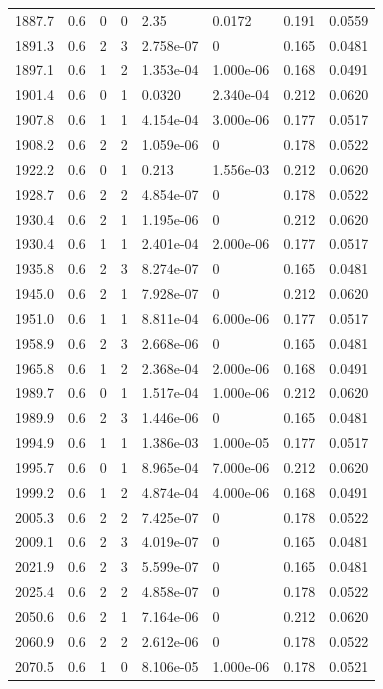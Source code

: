 \documentclass[preview]{standalone}
\begin{document}
{{{{\begin{tabular}{L{1.2cm}C{1.2cm} C{0.3cm}C{0.5cm} C{1.4cm}C{1.4cm} C{1.4cm}C{1.4cm}}
  1887.7  &   0.6  & 0     &  0 &  2.35  & 0.0172  & 0.191 &  0.0559   \\ 
  1891.3  &   0.6  & 2     &  3 &  2.758e-07  & 0  & 0.165 &  0.0481   \\ 
  1897.1  &   0.6  & 1     &  2 &  1.353e-04  & 1.000e-06  & 0.168 &  0.0491   \\ 
  1901.4  &   0.6  & 0     &  1 &  0.0320  & 2.340e-04  & 0.212 &  0.0620   \\ 
  1907.8  &   0.6  & 1     &  1 &  4.154e-04  & 3.000e-06  & 0.177 &  0.0517   \\ 
  1908.2  &   0.6  & 2     &  2 &  1.059e-06  & 0  & 0.178 &  0.0522   \\ 
  1922.2  &   0.6  & 0     &  1 &  0.213  & 1.556e-03  & 0.212 &  0.0620   \\ 
  1928.7  &   0.6  & 2     &  2 &  4.854e-07  & 0  & 0.178 &  0.0522   \\ 
  1930.4  &   0.6  & 2     &  1 &  1.195e-06  & 0  & 0.212 &  0.0620   \\ 
  1930.4  &   0.6  & 1     &  1 &  2.401e-04  & 2.000e-06  & 0.177 &  0.0517   \\ 
  1935.8  &   0.6  & 2     &  3 &  8.274e-07  & 0  & 0.165 &  0.0481   \\ 
  1945.0  &   0.6  & 2     &  1 &  7.928e-07  & 0  & 0.212 &  0.0620   \\ 
  1951.0  &   0.6  & 1     &  1 &  8.811e-04  & 6.000e-06  & 0.177 &  0.0517   \\ 
  1958.9  &   0.6  & 2     &  3 &  2.668e-06  & 0  & 0.165 &  0.0481   \\ 
  1965.8  &   0.6  & 1     &  2 &  2.368e-04  & 2.000e-06  & 0.168 &  0.0491   \\ 
  1989.7  &   0.6  & 0     &  1 &  1.517e-04  & 1.000e-06  & 0.212 &  0.0620   \\ 
  1989.9  &   0.6  & 2     &  3 &  1.446e-06  & 0  & 0.165 &  0.0481   \\ 
  1994.9  &   0.6  & 1     &  1 &  1.386e-03  & 1.000e-05  & 0.177 &  0.0517   \\ 
  1995.7  &   0.6  & 0     &  1 &  8.965e-04  & 7.000e-06  & 0.212 &  0.0620   \\ 
  1999.2  &   0.6  & 1     &  2 &  4.874e-04  & 4.000e-06  & 0.168 &  0.0491   \\ 
  2005.3  &   0.6  & 2     &  2 &  7.425e-07  & 0  & 0.178 &  0.0522   \\ 
  2009.1  &   0.6  & 2     &  3 &  4.019e-07  & 0  & 0.165 &  0.0481   \\ 
  2021.9  &   0.6  & 2     &  3 &  5.599e-07  & 0  & 0.165 &  0.0481   \\ 
  2025.4  &   0.6  & 2     &  2 &  4.858e-07  & 0  & 0.178 &  0.0522   \\ 
  2050.6  &   0.6  & 2     &  1 &  7.164e-06  & 0  & 0.212 &  0.0620   \\ 
  2060.9  &   0.6  & 2     &  2 &  2.612e-06  & 0  & 0.178 &  0.0522   \\ 
  2070.5  &   0.6  & 1     &  0 &  8.106e-05  & 1.000e-06  & 0.178 &  0.0521   \\ 
\hline 
\end{tabular} 

}}}}
\end{document}
